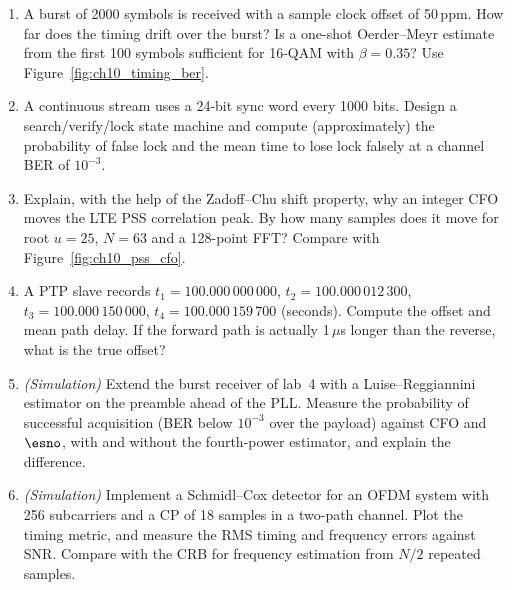 \begin{enumerate}[label=\thechapter.\arabic*]
Figure~\ref{fig:ch10_ted_scurves}(b)).
\item A burst of 2000 symbols is received with a sample clock offset of 50\,ppm. How far does the
timing drift over the burst? Is a one-shot Oerder--Meyr estimate from the first 100 symbols sufficient
for 16-QAM with $\beta=0.35$? Use Figure~\ref{fig:ch10_timing_ber}.
\item A continuous stream uses a 24-bit sync word every 1000 bits. Design a search/verify/lock state
machine and compute (approximately) the probability of false lock and the mean time to lose lock
falsely at a channel BER of $10^{-3}$.
\item Explain, with the help of the Zadoff--Chu shift property, why an integer CFO moves the LTE PSS
correlation peak. By how many samples does it move for root $u=25$, $N=63$ and a 128-point FFT?
Compare with Figure~\ref{fig:ch10_pss_cfo}.
\item A PTP slave records $t_1=100.000\,000\,000$, $t_2=100.000\,012\,300$, $t_3=100.000\,150\,000$,
$t_4=100.000\,159\,700$ (seconds). Compute the offset and mean path delay. If the forward path is
actually 1\,$\mu$s longer than the reverse, what is the true offset?
\item \emph{(Simulation)} Extend the burst receiver of lab~4 with a Luise--Reggiannini estimator on the
preamble ahead of the PLL. Measure the probability of successful acquisition (BER below $10^{-3}$ over
the payload) against CFO and $\esno$, with and without the fourth-power estimator, and explain the
difference.
\item \emph{(Simulation)} Implement a Schmidl--Cox detector for an OFDM system with 256 subcarriers and a
CP of 18 samples in a two-path channel. Plot the timing metric, and measure the RMS timing and
frequency errors against SNR. Compare with the CRB for frequency estimation from $N/2$ repeated
samples.
\end{enumerate}

